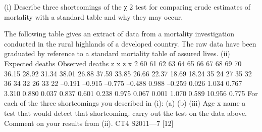 \documentclass[a4paper,12pt]{article}
\begin{document}
\begin{enumerate}

(i)
Describe three shortcomings of the χ 2 test for comparing crude estimates
of mortality with a standard table and why they may occur.

The following table gives an extract of data from a mortality investigation conducted
in the rural highlands of a developed country. The raw data have been graduated by
reference to a standard mortality table of assured lives.
(ii)
Expected
deaths Observed
deaths z x z x 2
60
61
62
63
64
65
66
67
68
69
70 36.15
28.92
31.34
38.01
26.88
37.59
33.85
26.66
22.37
18.69
18.24 35
24
27
35
32
36
34
32
26
33
22 –0.191
–0.915
–0.775
–0.488
0.988
–0.259
0.026
1.034
0.767
3.310
0.880 0.037
0.837
0.601
0.238
0.975
0.067
0.001
1.070
0.589
10.956
0.775
For each of the three shortcomings you described in (i):
(a)
(b)
(iii)
Age
x
name a test that would detect that shortcoming.
carry out the test on the data above.
Comment on your results from (ii).
CT4 S2011—7
[12]



\end{enumerate}
\end{document}
